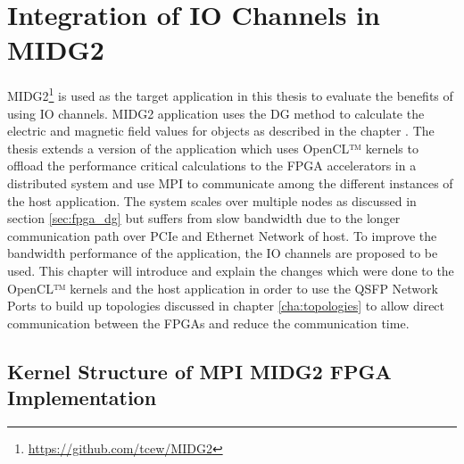 \chapter{Integration of IO Channels in MIDG2}
\label{cha:sys_arch}

MIDG2\footnote{\url{https://github.com/tcew/MIDG2}} is used as the target
application in this thesis to evaluate the benefits of using IO channels.
MIDG2 application uses the \ac{DG} method to calculate the electric and magnetic
field values for objects as described in the chapter .
The thesis extends a version of the application which uses OpenCL™ kernels to
offload the performance critical calculations to the FPGA accelerators in a
distributed system and use MPI to communicate among the different instances of the
host application. The system scales over multiple nodes as discussed in section
\ref{sec:fpga_dg} but suffers from slow bandwidth due to the longer communication
path over PCIe and Ethernet Network of host. To improve the bandwidth performance
of the application, the IO channels are proposed to be used. This chapter will
introduce and explain the changes which were done to the OpenCL™ kernels and the
host application in order to use the QSFP Network Ports to build up topologies discussed
in chapter \ref{cha:topologies} to allow direct communication between the FPGAs
and reduce the communication time.

\section{Kernel Structure of MPI MIDG2 FPGA Implementation}

